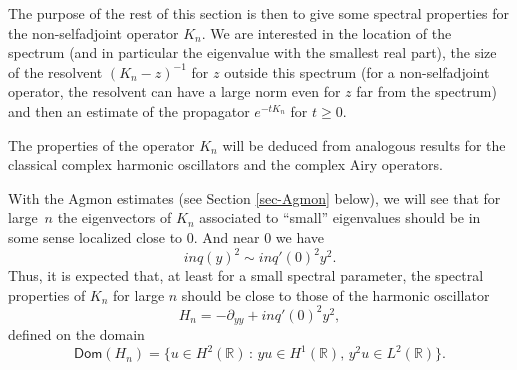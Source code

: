 \documentclass[JEP,XML,SOM,Unicode]{cedram}
\theoremstyle{plain}
\theoremstyle{definition}
\newcommand{\set}[1]{\{ #1\}}
\newcommand{\inv}{^{-1}}
\newcommand{\1}{\mathds 1}
\newcommand{\st}{\,:\,}
\newcommand{\Dom}{\mathsf{Dom}}
\newcommand{\R}{\mathbb{R}}
\begin{document}
The purpose of the rest of this section is then to give some spectral properties for the non-selfadjoint operator $K_n$. We are interested in the location of the spectrum (and in particular the eigenvalue with the smallest real part), the size of the resolvent $(K_n-z)\inv$ for $z$ outside this spectrum (for a non-selfadjoint operator, the resolvent can have a large norm even for $z$ far from the spectrum) and then an estimate of the propagator $e^{-t K_n}$ for $t \geq 0$.

The properties of the operator $K_n$ will be deduced from analogous results for the classical complex harmonic oscillators and the complex Airy operators.

With the Agmon estimates (see Section \ref{sec-Agmon} below), we will see that for large~$n$ the eigenvectors of $K_n$ associated to ``small'' eigenvalues should be in some sense localized close to 0. And near 0 we have
\[
in q(y)^2 \sim i n q'(0)^2 y^2.
\]
Thus, it is expected that, at least for a small spectral parameter, the spectral properties of $K_n$ for large $n$ should be close to those of the harmonic oscillator
\begin{equation} \label{def-Hn}
H_n = -\partial_{yy} + i n q'(0)^2 y^2,
\end{equation}
defined on the domain
\[
\Dom(H_n) = \set{ u \in H^2(\R) \st yu \in H^1(\R),\, y^2 u \in L^2(\R)}.
\]
\end{document}

